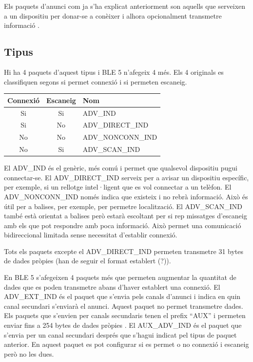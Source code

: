 Els paquets d'anunci com ja s'ha explicat anteriorment son aquells que serveixen a un dispositiu per donar-se a conèixer i alhora opcionalment transmetre informació \cite{Advertising}.

\subsection{Tipus}
Hi ha 4 paquets d'aquest tipus i BLE 5 n'afegeix 4 més.
Els 4 originals es classifiquen segons si permet connexió i si permeten escaneig.

\begin{center}
	\begin{tabular}{|c|c|l|}
		\hline
		Connexió	&	Escaneig	&	Nom	\\	\hline
		Si			&	Si			&	ADV\_IND	\\	\hline
		Si			&	No			&	ADV\_DIRECT\_IND	\\	\hline
		No			&	No			&	ADV\_NONCONN\_IND	\\	\hline
		No			&	Si			&	ADV\_SCAN\_IND	\\	\hline
	\end{tabular}
\end{center}

El ADV\_IND és el genèric, més comú i permet que qualsevol dispositiu pugui connectar-se.
El ADV\_DIRECT\_IND serveix per a avisar un dispositiu específic, per exemple, si un rellotge intel·ligent que es vol connectar a un telèfon.
El ADV\_NONCONN\_IND només indica que existeix i no rebrà informació.
Això és útil per a balises, per exemple, per permetre localització.
El ADV\_SCAN\_IND també està orientat a balises però estarà escoltant per si rep missatges d'escaneig amb els que pot respondre amb poca informació.
Això permet una comunicació bidireccional limitada sense necessitat d'establir connexió.

Tots els paquets excepte el ADV\_DIRECT\_IND permeten transmetre 31 bytes de dades pròpies (han de seguir el format establert (?)).

\label{Advertising_Extension_PDU}
En BLE 5 s'afegeixen 4 paquets més que permeten augmentar la quantitat de dades que es poden transmetre abans d'haver establert una connexió.
El ADV\_EXT\_IND és el paquet que s'envia pels canals d'anunci i indica en quin canal secundari s'enviarà el anunci. Aquest paquet no permet transmetre dades.
Els paquets que s'envien per canals secundaris tenen el prefix ``AUX'' i permeten enviar fins a 254 bytes de dades pròpies .
El AUX\_ADV\_IND és el paquet que s'envia per un canal secundari després que s'hagui indicat pel tipus de paquet anterior.
En aquest paquet es pot configurar si es permet o no connexió i escaneig però no les dues.

